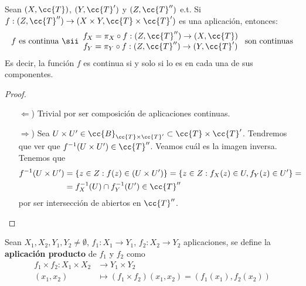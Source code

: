 \begin{prop}
    Sean $(X, \cc{T})$, $(Y, \cc{T}')$ y $(Z, \cc{T}'')$ e.t. Si $f:(Z, \cc{T}'')\to (X\times Y, \cc{T}\times \cc{T}')$ es una aplicación, entonces:
    \begin{align*}
        f \text{ es continua } \sii 
        \begin{array}{c}
            f_X=\pi_X \circ f : (Z, \cc{T}'')\to (X, \cc{T})\\
            f_Y=\pi_Y \circ f : (Z, \cc{T}'')\to (Y, \cc{T}')\\
        \end{array}
        \text{ son continuas}
    \end{align*}
    Es decir, la función $f$ es continua si y solo si lo es en cada una de sus componentes.
    \begin{proof}\
        \begin{itemize}
            \item[$\Leftarrow$)] Trivial por ser composición de aplicaciones continuas.
            \item[$\Rightarrow$)] Sea $U\times U'\in \cc{B}_{\cc{T}\times \cc{T}'}\subset \cc{T}\times \cc{T}'$. Tendremos que ver que $f^{-1}(U\times U')\in \cc{T}''$. Veamos cuál es la imagen inversa. Tenemos que
            \begin{align*}
                f^{-1}(U\times U') &= \{z\in Z : f(z)\in (U\times U')\} = \{z \in Z : f_X(z)\in U, f_Y(z)\in U'\}=\\
                &= f_X^{-1}(U)\cap f_Y^{-1}(U')\in \cc{T}''
            \end{align*}
            por ser intersección de abiertos en $\cc{T}''$.
        \end{itemize}
    \end{proof}
\end{prop}

\begin{definicion}
    Sean $X_1, X_2, Y_1, Y_2\neq \emptyset$, $f_1:X_1 \to Y_1$, $f_2:X_2 \to Y_2$ aplicaciones, se define la \textbf{aplicación producto} de $f_1$ y $f_2$ como
    \begin{align*}
        f_1 \times f_2 : X_1 \times X_2 &\to Y_1 \times Y_2\\
        (x_1, x_2) &\mapsto (f_1 \times f_2)(x_1, x_2) = (f_1(x_1), f_2(x_2))
    \end{align*}
    \endsquare
\end{definicion}

